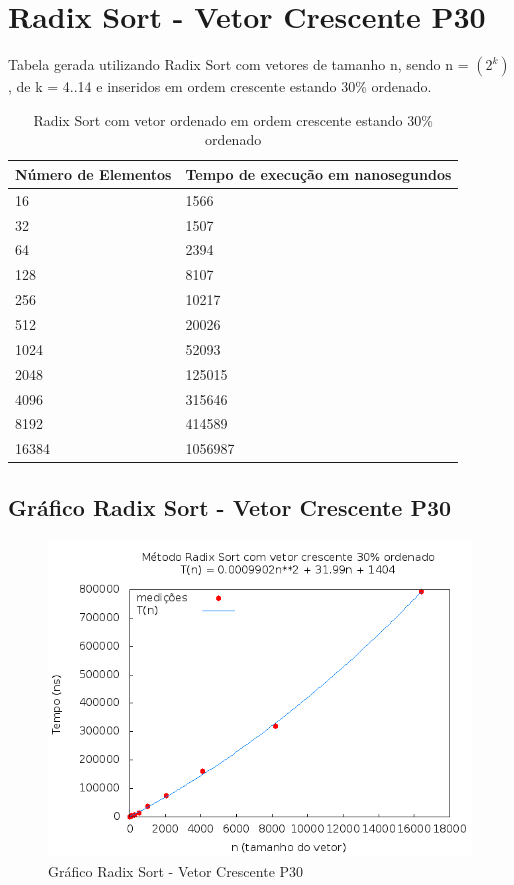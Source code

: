 \documentclass[12pt,a4paper,twoside]{report}
\begin{document}
\section{Radix Sort - Vetor Crescente P30}
Tabela gerada utilizando Radix Sort com vetores de tamanho n, sendo n = $(2^k)$, de k = 4..14 e inseridos em ordem crescente estando 30\% ordenado.
\begin{table}[H]
\centering
\caption{Radix Sort com vetor ordenado em ordem crescente estando 30\% ordenado}
\label{my-label}
\begin{tabular}{|l|l|}
\hline
\multicolumn{1}{|c|}{\textbf{Número de Elementos}} & \multicolumn{1}{c|}{\textbf{Tempo de execução em nanosegundos}} \\ \hline
16 & 1566 \\ \hline
32 & 1507 \\ \hline
64 & 2394 \\ \hline
128 & 8107 \\ \hline
256 & 10217 \\ \hline
512 & 20026 \\ \hline
1024 & 52093 \\ \hline
2048 & 125015 \\ \hline
4096 & 315646 \\ \hline
8192 & 414589 \\ \hline
16384 & 1056987 \\ \hline
\end{tabular}
\end{table}

\subsection{Gráfico Radix Sort - Vetor Crescente P30}
\begin{figure}[H]
    \centering
    \includegraphics[width=0.7\linewidth]{graficos/RadixSort/vIntCrescenteP30/vIntCrescenteP30.png}
  \caption{Gráfico Radix Sort - Vetor Crescente P30}
\end{figure}
\end{document}
